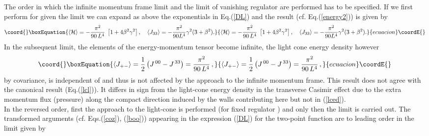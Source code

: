 \documentclass[a4paper,twocolumn,eqsecnum,aps]{revtex4}
\begin{document}
 The order in which the  infinite momentum frame  limit \coordHE{} and  the limit of vanishing regulator \coordHE{} are performed has to be specified. If we first perform for given \coordHE{} the \coordHE{} limit \coordHE{}  we can expand as above  the exponentials in Eq.(\ref{DL}) and   the result (cf. Eq.(\ref{energy2})) is given by  
 \begin{equation}\coord{}\boxEquation{
  \label{edmf}
  \langle {\cal H}\rangle  = -\frac{\pi^{2}}{90 \, L^{4}} \; \left [1 + 4 \beta^{2} \gamma ^{2} \right ] , 
\quad \langle J_{33}\rangle =  - \frac{\pi^2}{90 L^{4}} \gamma ^{2}(3 + \beta ^{2} ).
}{
  \langle {\cal H}\rangle  = -\frac{\pi^{2}}{90 \, L^{4}} \; \left [1 + 4 \beta^{2} \gamma ^{2} \right ] , 
\quad \langle J_{33}\rangle =  - \frac{\pi^2}{90 L^{4}} \gamma ^{2}(3 + \beta ^{2} ).
}{ecuacion}\coordE{}\end{equation}
In the subsequent \coordHE{} limit, the elements of the energy-momentum tensor become infinite, the  light cone energy density however 
\begin{equation}\coord{}\boxEquation{
  \label{lced2}
  \langle J_{+ - }\rangle = \frac{1}{2} \left (J^{\,00} - J^{\,33} \right ) = \frac{\pi ^{2}}{90 \, L^{4}}\, ,
}{
  \langle J_{+ - }\rangle = \frac{1}{2} \left (J^{\,00} - J^{\,33} \right ) = \frac{\pi ^{2}}{90 \, L^{4}}\, ,
}{ecuacion}\coordE{}\end{equation}
by covariance,  is independent of \myHighlight{$\beta$}\coordHE{} and thus is not affected by the approach to the infinite momentum frame. This result does 
not agree  with the canonical result (Eq.(\ref{lcl})). It differs in sign from the light-cone energy density in the transverse Casimir effect due to the extra momentum flux (pressure) along the compact direction induced by the walls contributing here but not in (\ref{lced}). \\ 
In the reversed order, first the  approach to the light-cone is performed (for fixed regulator \coordHE{}) and only then  the \coordHE{} limit is carried out. 
The transformed arguments (cf. Eqs.(\ref{coz}), (\ref{boo})) appearing in the expression (\ref{DL}) for the two-point function are to leading order in the  \coordHE{} limit  given by 
\end{document}
